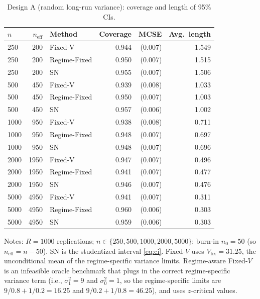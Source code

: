\documentclass[11pt]{article}
\numberwithin{equation}{section}
\newcommand{\mcse}[1]{{\footnotesize\,(#1)}}
\theoremstyle{plain}
\theoremstyle{definition}
\theoremstyle{remark}
\begin{document}
\begin{table}[!htbp]
\centering
\small
\begin{threeparttable}
\caption{Design A (random long-run variance): coverage and length of 95\% CIs.}
\label{tab:simA_main}
\begin{tabular}{@{}l r l r r r@{}}
\toprule
{$n$} & {$n_{\mathrm{eff}}$} & {Method} & {Coverage} & {MCSE} & {Avg.\ length} \\
\midrule
250 & 200 & Fixed-V & 0.944 & \mcse{0.007} & 1.549 \\
250 & 200 & Regime-Fixed & 0.950 & \mcse{0.007} & 1.515 \\
250 & 200 & SN & 0.955 & \mcse{0.007} & 1.506 \\
500 & 450 & Fixed-V & 0.939 & \mcse{0.008} & 1.033 \\
500 & 450 & Regime-Fixed & 0.950 & \mcse{0.007} & 1.003 \\
500 & 450 & SN & 0.957 & \mcse{0.006} & 1.002 \\
1000 & 950 & Fixed-V & 0.938 & \mcse{0.008} & 0.711 \\
1000 & 950 & Regime-Fixed & 0.948 & \mcse{0.007} & 0.697 \\
1000 & 950 & SN & 0.948 & \mcse{0.007} & 0.696 \\
2000 & 1950 & Fixed-V & 0.947 & \mcse{0.007} & 0.496 \\
2000 & 1950 & Regime-Fixed & 0.941 & \mcse{0.007} & 0.477 \\
2000 & 1950 & SN & 0.946 & \mcse{0.007} & 0.476 \\
5000 & 4950 & Fixed-V & 0.941 & \mcse{0.007} & 0.311 \\
5000 & 4950 & Regime-Fixed & 0.960 & \mcse{0.006} & 0.303 \\
5000 & 4950 & SN & 0.959 & \mcse{0.006} & 0.303 \\
\bottomrule
\end{tabular}
\begin{tablenotes}[flushleft]
\footnotesize
\item Notes: $R=1000$ replications; $n\in\{250,500,1000,2000,5000\}$; burn-in $n_0=50$ (so $n_{\mathrm{eff}}=n-50$). SN is the studentized interval \eqref{eq:ci}. Fixed-$V$ uses $V_{\mathrm{fix}}=31.25$, the unconditional mean of the regime-specific variance limits. Regime-aware Fixed-$V$ is an infeasible oracle benchmark that plugs in the correct regime-specific variance term (i.e., $\sigma_1^2=9$ and $\sigma_0^2=1$, so the regime-specific limits are $9/0.8+1/0.2=16.25$ and $9/0.2+1/0.8=46.25$), and uses $z$-critical values.
\end{tablenotes}
\end{threeparttable}
\end{table}
\end{document}
